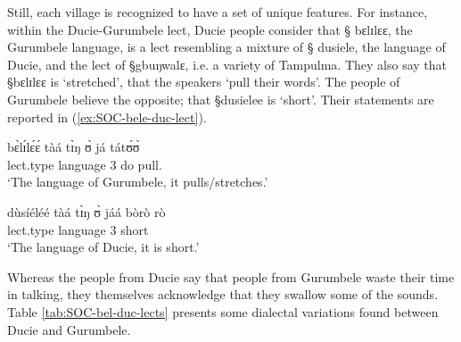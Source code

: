 Still, each village is recognized to have a set of unique features. For
instance, within the Ducie-Gurumbele lect, Ducie people consider that {\S
bɛlɪlɛɛ}, the Gurumbele language,  is a lect resembling a mixture of {\S
dusiele}, the language of Ducie, and the lect of {\S gbuŋwalɛ}, i.e. a variety
of Tampulma. They also say that {\S bɛlɪlɛɛ} is `stretched', that the speakers
`pull their words'. The people of Gurumbele
believe the opposite; that {\S dusielee}  is
`short'. Their statements are  reported in (\ref{ex:SOC-bele-duc-lect}). 



\begin{exe}
 \ex\label{ex:SOC-bele-duc-lect}
\begin{xlist}
 \ex\label{ex:SOC-bele-lect}
\gll bɛ̀lɪ́lɛ́ɛ́ tàá tɪ̀ŋ ʊ̀ já tátʊ́ʊ̀\\
lect.type language {\art} {3\sg} do pull.{\foc}\\
\glt `The language of Gurumbele, it pulls/stretches.'

 \ex\label{ex:SOC-ducie-lect}
\gll dùsíéléé tàá tɪ̀ŋ ʊ̀ jáá bòrò rò\\
lect.type language {\art} {3\sg} {\ident}  short {\foc}\\
\glt `The language of Ducie, it is short.'
\end{xlist}
\end{exe}



 Whereas the people from Ducie say that people from Gurumbele waste their time
in talking, they themselves acknowledge that they swallow some of the sounds.
Table \ref{tab:SOC-bel-duc-lects} presents some dialectal variations found
between Ducie and Gurumbele. 



